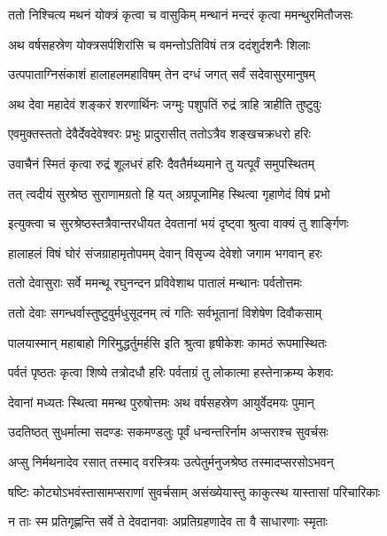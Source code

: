 \twolineshloka
{ततो निश्चित्य मथनं योक्त्रं कृत्वा च वासुकिम्}
{मन्थानं मन्दरं कृत्वा ममन्थुरमितौजसः} %

\twolineshloka
{अथ वर्षसहस्रेण योक्त्रसर्पशिरांसि च}
{वमन्तोऽतिविषं तत्र ददंशुर्दशनैः शिलाः} %

\twolineshloka
{उत्पपाताग्निसंकाशं हालाहलमहाविषम्}
{तेन दग्धं जगत् सर्वं सदेवासुरमानुषम्} %

\twolineshloka
{अथ देवा महादेवं शङ्करं शरणार्थिनः}
{जग्मुः पशुपतिं रुद्रं त्राहि त्राहीति तुष्टुवुः} %

\twolineshloka
{एवमुक्तस्ततो देवैर्देवदेवेश्वरः प्रभुः}
{प्रादुरासीत् ततोऽत्रैव शङ्खचक्रधरो हरिः} %

\twolineshloka
{उवाचैनं स्मितं कृत्वा रुद्रं शूलधरं हरिः}
{दैवतैर्मथ्यमाने तु यत्पूर्वं समुपस्थितम्} %

\twolineshloka
{तत् त्वदीयं सुरश्रेष्ठ सुराणामग्रतो हि यत्}
{अग्रपूजामिह स्थित्वा गृहाणेदं विषं प्रभो} %

\twolineshloka
{इत्युक्त्वा च सुरश्रेष्ठस्तत्रैवान्तरधीयत}
{देवतानां भयं दृष्ट्वा श्रुत्वा वाक्यं तु शार्ङ्गिणः} %

\twolineshloka
{हालाहलं विषं घोरं संजग्राहामृतोपमम्}
{देवान् विसृज्य देवेशो जगाम भगवान् हरः} %

\twolineshloka
{ततो देवासुराः सर्वे ममन्थू रघुनन्दन}
{प्रविवेशाथ पातालं मन्थानः पर्वतोत्तमः} %

\twolineshloka
{ततो देवाः सगन्धर्वास्तुष्टुवुर्मधुसूदनम्}
{त्वं गतिः सर्वभूतानां विशेषेण दिवौकसाम्} %

\twolineshloka
{पालयास्मान् महाबाहो गिरिमुद्धर्तुमर्हसि}
{इति श्रुत्वा हृषीकेशः कामठं रूपमास्थितः} %

\twolineshloka
{पर्वतं पृष्ठतः कृत्वा शिष्ये तत्रोदधौ हरिः}
{पर्वताग्रं तु लोकात्मा हस्तेनाक्रम्य केशवः} %

\twolineshloka
{देवानां मध्यतः स्थित्वा ममन्थ पुरुषोत्तमः}
{अथ वर्षसहस्रेण आयुर्वेदमयः पुमान्} %

\twolineshloka
{उदतिष्ठत् सुधर्मात्मा सदण्डः सकमण्डलुः}
{पूर्वं धन्वन्तरिर्नाम अप्सराश्च सुवर्चसः} %

\twolineshloka
{अप्सु निर्मथनादेव रसात् तस्माद् वरस्त्रियः}
{उत्पेतुर्मनुजश्रेष्ठ तस्मादप्सरसोऽभवन्} %

\twolineshloka
{षष्टिः कोट्योऽभवंस्तासामप्सराणां सुवर्चसाम्}
{असंख्येयास्तु काकुत्स्थ यास्तासां परिचारिकाः} %

\twolineshloka
{न ताः स्म प्रतिगृह्णन्ति सर्वे ते देवदानवाः}
{अप्रतिग्रहणादेव ता वै साधारणाः स्मृताः} %

